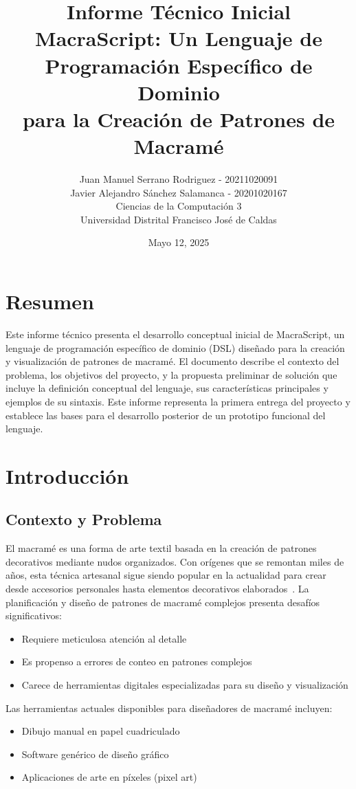 \documentclass[12pt,a4paper]{report}
\title{{\Huge \textbf{Informe Técnico Inicial}}\\
       {\Large MacraScript: Un Lenguaje de Programación Específico de Dominio\\para la Creación de Patrones de Macramé}}
\author{Juan Manuel Serrano Rodriguez - 20211020091 \\ Javier Alejandro Sánchez Salamanca - 20201020167 \\
\vspace{0.5cm} \normalsize{Ciencias de la Computación 3} \\
\normalsize{Universidad Distrital Francisco José de Caldas}}
\date{Mayo 12, 2025}
\begin{document}
\maketitle
\tableofcontents

\chapter*{Resumen}
Este informe técnico presenta el desarrollo conceptual inicial de MacraScript, un lenguaje de programación específico de dominio (DSL) diseñado para la creación y visualización de patrones de macramé. El documento describe el contexto del problema, los objetivos del proyecto, y la propuesta preliminar de solución que incluye la definición conceptual del lenguaje, sus características principales y ejemplos de su sintaxis. Este informe representa la primera entrega del proyecto y establece las bases para el desarrollo posterior de un prototipo funcional del lenguaje.

\chapter{Introducción}

\section{Contexto y Problema}
El macramé es una forma de arte textil basada en la creación de patrones decorativos mediante nudos organizados. Con orígenes que se remontan miles de años, esta técnica artesanal sigue siendo popular en la actualidad para crear desde accesorios personales hasta elementos decorativos elaborados~\cite{karner2005}. La planificación y diseño de patrones de macramé complejos presenta desafíos significativos:

\begin{itemize}
    \item Requiere meticulosa atención al detalle
    \item Es propenso a errores de conteo en patrones complejos
    \item Carece de herramientas digitales especializadas para su diseño y visualización
\end{itemize}

Las herramientas actuales disponibles para diseñadores de macramé incluyen:

\begin{itemize}
    \item Dibujo manual en papel cuadriculado
    \item Software genérico de diseño gráfico
    \item Aplicaciones de arte en píxeles (pixel art)
\end{itemize}
\end{document}
